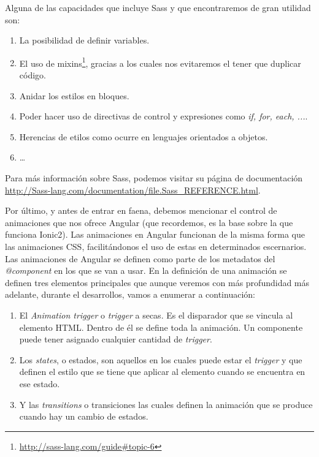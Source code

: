 
Alguna de las capacidades que incluye \gls{Sass} y que encontraremos de gran utilidad son:
\begin{enumerate}
  \item La posibilidad de definir variables.
  \item El uso de mixins\footnote{\url{http://sass-lang.com/guide#topic-6}}, gracias a los cuales nos evitaremos el tener que duplicar código.
  \item Anidar los estilos en bloques.
  \item Poder hacer uso de directivas de control y expresiones como \emph{if, for, each, ...}.
  \item Herencias de etilos como ocurre en lenguajes orientados a objetos.
  \item \ldots{}
\end{enumerate}

Para más información sobre \gls{Sass}, podemos visitar su página de documentación \url{http://Sass-lang.com/documentation/file.Sass_REFERENCE.html}.

Por último, y antes de entrar en faena, debemos mencionar el control de animaciones que nos ofrece Angular (que recordemos, es la base sobre la que funciona Ionic2). Las animaciones en Angular funcionan de la misma forma que las animaciones \gls{CSS}, facilitándonos el uso de estas en determinados escernarios. Las animaciones de Angular se definen como parte de los metadatos del \emph{@component} en los que se van a usar. En la definición de una animación se definen tres elementos principales que aunque veremos con más profundidad más adelante, durante el desarrollos, vamos a enumerar a continuación:

\begin{enumerate}
  \item El \emph{Animation trigger} o \emph{trigger} a secas. Es el disparador que se vincula al elemento \gls{HTML}. Dentro de él se define toda la animación. Un componente puede tener asignado cualquier cantidad de \emph{trigger}.
  \item Los \emph{states}, o estados, son aquellos en los cuales puede estar el \emph{trigger} y que definen el estilo que se tiene que aplicar al elemento cuando se encuentra en ese estado.
  \item Y las \emph{transitions} o transiciones las cuales definen la animación que se produce cuando hay un cambio de estados.
\end{enumerate}

